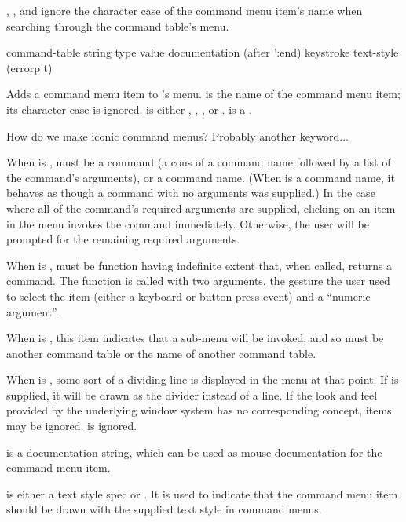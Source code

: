 , ,
and  ignore the character case of the command menu item's
name when searching through the command table's menu.


 {command-table string type value 
                                         \key documentation (after ':end) keystroke
                                              text-style (errorp t)}

Adds a command menu item to 's menu.   is the
name of the command menu item; its character case is ignored.   is
either , , , or .
 is a .

 {How do we make iconic command menus?  Probably another keyword...}

When  is ,  must be a command (a cons of a
command name followed by a list of the command's arguments), or a command name.
(When  is a command name, it behaves as though a command with no
arguments was supplied.)  In the case where all of the command's required
arguments are supplied, clicking on an item in the menu invokes the command
immediately.  Otherwise, the user will be prompted for the remaining required
arguments.

When  is ,  must be function having
indefinite extent that, when called, returns a command.  The function is called
with two arguments, the gesture the user used to select the item (either a
keyboard or button press event) and a ``numeric argument''.

When  is , this item indicates that a sub-menu will be
invoked, and so  must be another command table or the name of
another command table.

When  is , some sort of a dividing line is displayed in
the menu at that point.  If  is supplied, it will be drawn as the
divider instead of a line.  If the look and feel provided by the underlying
window system has no corresponding concept,  items may be ignored.
 is ignored.

 is a documentation string, which can be used as mouse
documentation for the command menu item.

 is either a text style spec or .  It is used to
indicate that the command menu item should be drawn with the supplied text style
in command menus.

